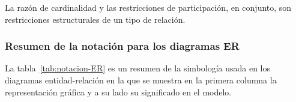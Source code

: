 La razón de cardinalidad y las restricciones de participación, en conjunto, son restricciones estructurales de un tipo de relación.





\subsubsection{Resumen de la notación para los diagramas ER}


La tabla~\ref{tab:notacion-ER} es un resumen de la simbología usada en los diagramas entidad-relación en la que se muestra en la primera columna la representación gráfica y a su lado su significado en el modelo.

